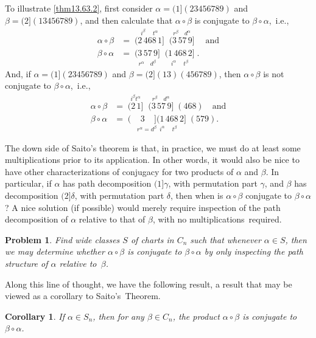 \documentclass{surv-l}
\numberwithin{equation}{section}
\numberwithin{table}{section}
\numberwithin{figure}{section}
\theoremstyle{plain}
\newtheorem{corollary}[equation]{Corollary}
\newtheorem{problem}[equation]{Problem}
\theoremstyle{definition}
\begin{document}
To illustrate \ref{thm13.63.2}, first consider
$\alpha=(1](23456789)$ and $\beta=(2](13456789)$, and then
calculate that $\alpha \circ\beta$ is conjugate to
$\beta\circ\alpha$,~i.e.,
\begin{align*}
\alpha\circ\beta &= \mathop{(2\,468\,1]}\limits^{i^{\beta}\quad\ t^{\alpha}} \mathop{(3\,57\,9]}\limits^{r^{\beta}\quad d^{\alpha}}\quad \mathrm{and}\\
\beta \circ\alpha &=\mathop{(3\,57\,9]}\limits_{{r^{\alpha} \quad d^{\beta}}} \mathop{(1\,468\,2]}\limits_{i^{\alpha}\quad\ t^{\beta}}.
\end{align*}
And, if $\alpha=(1](23456789)$ and $\beta=(2](13)(456789)$, then
$\alpha \circ\beta$ is not conjugate to $\beta \circ\alpha$,~i.e.,
\begin{align*}
\alpha\circ\beta &= \mathop{(2\,1]}\limits^{{i^{\beta}t^{\alpha}}} \mathop{(3\,57\,9]}\limits^{r^{\beta}\quad d^{\alpha}}(468)\quad \mathrm{and}\\
\beta \circ\alpha &=\mathop{(\quad 3\quad](1\,468\,2]}\limits_{r^{\alpha}=d^{\beta}\enspace i^{\alpha}\quad\ t^{\beta}}(579).
\end{align*}

The down side of Saito's theorem is that,
in practice, we must do at least some multiplications prior to its
application. In other words, it would also be nice to have other
characterizations of conjugacy for two products of $\alpha$ and
$\beta$. In particular, if $\alpha$ has path decomposition
$(1]\gamma$, with permutation part $\gamma$, and $\beta$ has
decomposition $(2]\delta$, with permutation part $\delta$, then
when is $\alpha \circ\beta$ conjugate to $\beta \circ\alpha$? A
nice solution (if possible) would merely require inspection of the
path decomposition of $\alpha$ relative to that of $\beta$, with
no multiplications~required.

\begin{problem}\label{prob13.63.3}
Find wide classes $S$ of charts in $C_{n}$ such that whenever
$\alpha\in S$, then we may determine whether $\alpha
\circ\beta$ is conjugate to $\beta \circ\alpha$ by only
inspecting the path structure of $\alpha$ relative to~$\beta$.
\end{problem}

Along this line of thought, we have the following result, a result
that may be viewed as a corollary to Saito's~Theorem.

\begin{corollary}\label{cor13.63.4}
If $\alpha\in S_{n}$, then for any $\beta\in C_{n}$, the
product $\alpha \circ\beta$ is conjugate to $\beta
\circ\alpha$.
\end{corollary}
\end{document}
